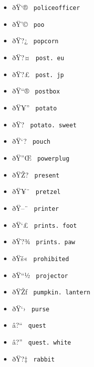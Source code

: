 \begin{itemize}
\item
  \label{symbol-policeofficer}{{ ðŸ`® }
  \texttt{\ policeofficer\ }}
\item
  \label{symbol-poo}{{ ðŸ'© } \texttt{\ poo\ }}
\item
  \label{symbol-popcorn}{{ ðŸ?¿ } \texttt{\ popcorn\ }}
\item
  \label{symbol-post.eu}{{ ðŸ?¤ } \texttt{\ post.\ eu\ }}
\item
  \label{symbol-post.jp}{{ ðŸ?£ } \texttt{\ post.\ jp\ }}
\item
  \label{symbol-postbox}{{ ðŸ``® } \texttt{\ postbox\ }}
\item
  \label{symbol-potato}{{ ðŸ¥'' } \texttt{\ potato\ }}
\item
  \label{symbol-potato.sweet}{{ ðŸ? }
  \texttt{\ potato.\ sweet\ }}
\item
  \label{symbol-pouch}{{ ðŸ`? } \texttt{\ pouch\ }}
\item
  \label{symbol-powerplug}{{ ðŸ''Œ }
  \texttt{\ powerplug\ }}
\item
  \label{symbol-present}{{ ðŸŽ? } \texttt{\ present\ }}
\item
  \label{symbol-pretzel}{{ ðŸ¥¨ } \texttt{\ pretzel\ }}
\item
  \label{symbol-printer}{{ ðŸ--¨ } \texttt{\ printer\ }}
\item
  \label{symbol-prints.foot}{{ ðŸ`£ }
  \texttt{\ prints.\ foot\ }}
\item
  \label{symbol-prints.paw}{{ ðŸ?¾ }
  \texttt{\ prints.\ paw\ }}
\item
  \label{symbol-prohibited}{{ ðŸš« }
  \texttt{\ prohibited\ }}
\item
  \label{symbol-projector}{{ ðŸ``½ }
  \texttt{\ projector\ }}
\item
  \label{symbol-pumpkin.lantern}{{ ðŸŽƒ }
  \texttt{\ pumpkin.\ lantern\ }}
\item
  \label{symbol-purse}{{ ðŸ`› } \texttt{\ purse\ }}
\item
  \label{symbol-quest}{{ â?{}`` } \texttt{\ quest\ }}
\item
  \label{symbol-quest.white}{{ â?'' }
  \texttt{\ quest.\ white\ }}
\item
  \label{symbol-rabbit}{{ ðŸ?‡ } \texttt{\ rabbit\ }}

\end{itemize}
